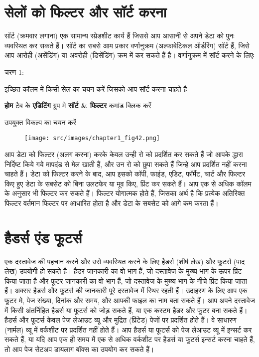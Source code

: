 \section{सेलों को फिल्टर और सॉर्ट करना}\label{id-1.22}

सॉर्ट (क्रमवार लगाना) एक सामान्य स्प्रेडशीट कार्य हैं जिससे आप आसानी से अपने डेटा को पुनः व्यवस्थित कर सकते हैं। सॉर्ट का सबसे आम प्रकार वर्णानुक्रम (अल्फाबेटिकल ऑर्डरिंग) सॉर्ट हैं, जिसे आप आरोही (असेंडिंग) या अवरोही (डिसेंडिंग) क्रम में कर सकते हैं है। वर्णानुक्रम में सॉर्ट करने के लिएः

\begin{descriptionSimple}{चरण 1:}
\item[चरण 1] इच्छित कॉलम में किसी सेल का चयन करें जिसको आप सॉर्ट करना चाहते है
\item[चरण 2] \textbf{होम} टैब के \textbf{एडिटिंग} ग्रुप मे \textbf{सॉर्ट \& फिल्टर} कमांड क्लिक करें
\item[चरण 3] उपयुक्त विकल्प का चयन करें
\end{descriptionSimple}
\begin{figure}[H]
\centering
\texttt{[image: src/images/chapter1\_fig42.png]}
\end{figure}

आप डेटा को फिल्टर (अलग करना) करके केवल उन्ही रो को प्रदर्शित कर सकते हैं जो आपके द्धारा निर्दिष्ट किये गये मापदंड से मेल खाती हैं, और उन रो को छुपा सकते हैं जिन्हे आप प्रदर्शित नहीं करना चाहते हैं। डेटा को फिल्टर करने के बाद, आप इसको कॉपी, फाइंड, एडिट, फॉर्मेट, चार्ट और फिल्टर किए हुए डेटा के सबसेट को बिना उलटफेर या मूव किए, प्रिंट कर सकते हैं। आप एक से अधिक कॉलम के अनुसार भी फिल्टर कर सकते हैं। फिल्टर योगात्मक होते हैं, जिसका अर्थ है कि प्रत्येक अतिरिक्त फिल्टर वर्तमान फिल्टर पर आधारित होता है और डेटा के सबसेट को आगे कम करता हैं।


\section{हैडर्स एंड फूटर्स}\label{id-1.23}

एक दस्तावेज की पहचान करने और उसे व्यवस्थित करने के लिए हैडर्स (शीर्ष लेख) और फूटर्स (पाद लेख) उपयोगी हो सकते है। हैडर जानकारी का वो भाग हैं, जो दस्तावेज के मुख्य भाग के ऊपर प्रिंट किया जाता है और फूटर जानकारी का वो भाग हैं, जो दस्तावेज के मुख्य भाग के नीचे प्रिंट किया जाता हैं। अक्सर हैडर्स और फूटर्स की जानकारी पूरे दस्तावेज में स्थिर रहती हैं। उदाहरण के लिए आप एक फूटर मे, पेज संख्या, दिनांक और समय, और आपकी फाइल का नाम बता सकते हैं। आप अपने दस्तावेज में किसी अंतर्निहित हैडर्स या फूटर्स को जोड़ सकते हैं, या एक कस्टम हैडर और फूटर बना सकते हैं। हैडर्स और फूटर्स केवल पेज लेआउट व्यू और मुद्रित (प्रिंटेड) पेजों पर प्रदर्शित होते हैं। वे साधारण (नार्मल) व्यू में वर्कशीट पर प्रदर्शित नहीं होते हैं। आप हैडर्स या फूटर्स को पेज लेआउट व्यू में इन्सर्ट कर सकते हैं, या यदि आप एक ही समय में एक से अधिक वर्कशीट पर हैडर्स या फूटर्स इन्सर्ट करना चाहते हैं, तो आप पेज सेटअप डायलाग बॉक्स का उपयोग कर सकते हैं।


